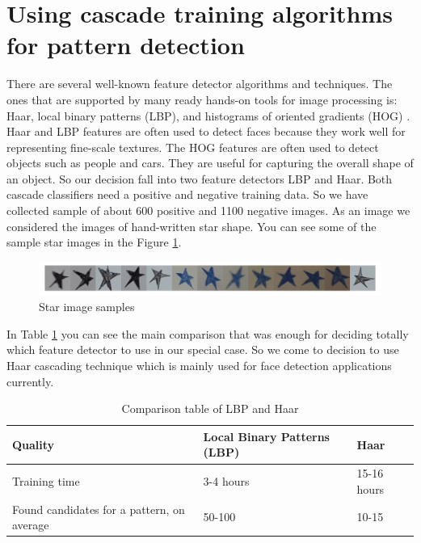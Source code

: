 \section{Using cascade training algorithms for pattern detection}
There are several well-known feature detector algorithms and techniques. The ones that are supported by many ready hands-on tools for image processing is: Haar, local binary patterns (LBP), and histograms of oriented gradients (HOG) \cite{Lienhart}. Haar and LBP features are often used to detect faces because they work well for representing fine-scale textures. The HOG features are often used to detect objects such as people and cars. They are useful for capturing the overall shape of an object. So our decision fall into two feature detectors LBP and Haar. Both cascade classifiers need a positive and negative training data. So we have collected sample of about 600 positive and 1100 negative images. As an image we considered the images of hand-written star shape. You can see some of the sample star images in the Figure \ref{fig:star_images_sample}.
\begin{figure}[h]
    \centering
    \includegraphics[width=\textwidth]{Figures/star_images_sample}
    \caption{Star image samples}
    \label{fig:star_images_sample}
\end{figure}

In Table \ref{tab:lbp_vs_haar} you can see the main comparison that was enough for deciding totally which feature detector to use in our special case. So we come to decision to use Haar cascading technique which is mainly used for face detection applications currently.

\begin{longtable}[t]{|p{}|p{}|p{}|}
\caption{Comparison table of LBP and Haar}\label{tab:lbp_vs_haar} \\
	\hline
	\textbf{Quality} & \textbf{Local Binary Patterns (LBP)} & \textbf{Haar} \\
	\hline
	\endhead
	Training time 
	& 3-4 hours
	& 15-16 hours\\
	\hline
	Found candidates for a pattern, on average 
	& 50-100
	& 10-15 \\
	\hline
\end{longtable}


